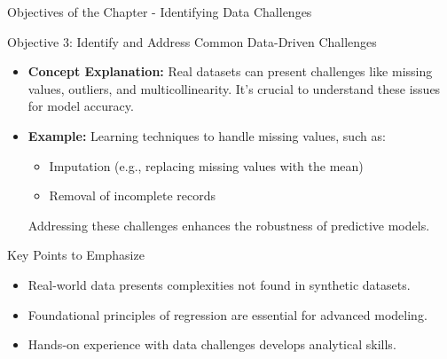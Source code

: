 \documentclass[aspectratio=169]{beamer}
\begin{document}
\begin{frame}[fragile]{Objectives of the Chapter - Identifying Data Challenges}
    \begin{block}{Objective 3: Identify and Address Common Data-Driven Challenges}
        \begin{itemize}
            \item \textbf{Concept Explanation:} Real datasets can present challenges like missing values, outliers, and multicollinearity. It's crucial to understand these issues for model accuracy.
            \item \textbf{Example:} Learning techniques to handle missing values, such as:
            \begin{itemize}
                \item Imputation (e.g., replacing missing values with the mean)
                \item Removal of incomplete records
            \end{itemize}
            Addressing these challenges enhances the robustness of predictive models.
        \end{itemize}
    \end{block}

    \begin{block}{Key Points to Emphasize}
        \begin{itemize}
            \item Real-world data presents complexities not found in synthetic datasets.
            \item Foundational principles of regression are essential for advanced modeling.
            \item Hands-on experience with data challenges develops analytical skills.
        \end{itemize}
    \end{block}
\end{frame}
\end{document}
